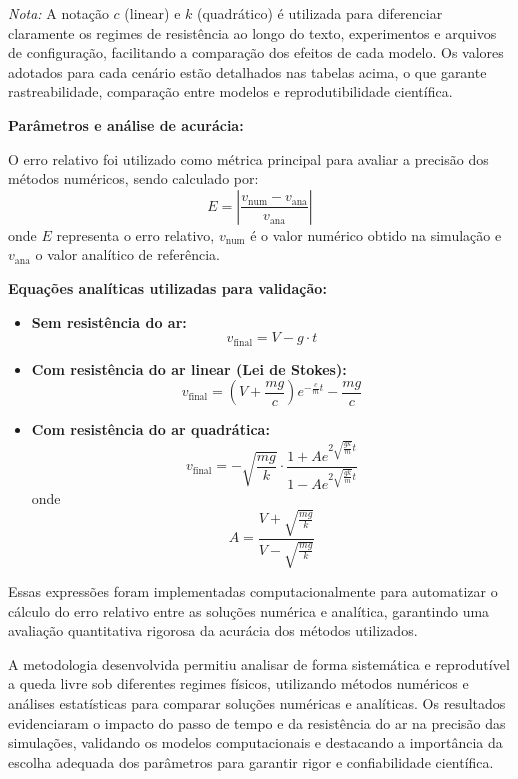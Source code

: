 \textit{Nota:} A notação $c$ (linear) e $k$ (quadrático) é utilizada para diferenciar claramente os regimes de resistência ao longo do texto, experimentos e arquivos de configuração, facilitando a comparação dos efeitos de cada modelo. Os valores adotados para cada cenário estão detalhados nas tabelas acima, o que garante rastreabilidade, comparação entre modelos e reprodutibilidade científica.

\textbf{Parâmetros e análise de acurácia:}


O erro relativo foi utilizado como métrica principal para avaliar a precisão dos métodos numéricos, sendo calculado por:
\begin{equation}
    E = \left| \frac{v_{\text{num}} - v_{\text{ana}}}{v_{\text{ana}}} \right|
\end{equation}
onde $E$ representa o erro relativo, $v_{\text{num}}$ é o valor numérico obtido na simulação e $v_{\text{ana}}$ o valor analítico de referência.

\textbf{Equações analíticas utilizadas para validação:}
\begin{itemize}
    \item \textbf{Sem resistência do ar:}
    \begin{equation}
        v_{\text{final}} = V - g \cdot t
    \end{equation}
    \item \textbf{Com resistência do ar linear (Lei de Stokes):}
    \begin{equation}
        v_{\text{final}} = \left(V + \frac{mg}{c}\right) e^{-\frac{c}{m} t} - \frac{mg}{c}
    \end{equation}
    \item \textbf{Com resistência do ar quadrática:}
    \begin{equation}
        v_{\text{final}} = -\sqrt{\frac{mg}{k}} \cdot \frac{1 + A e^{2 \sqrt{\frac{gk}{m}} t}}{1 - A e^{2 \sqrt{\frac{gk}{m}} t}}
    \end{equation}
    onde
    \begin{equation}
        A = \frac{V + \sqrt{\frac{mg}{k}}}{V - \sqrt{\frac{mg}{k}}}
    \end{equation}
\end{itemize}
Essas expressões foram implementadas computacionalmente para automatizar o cálculo do erro relativo entre as soluções numérica e analítica, garantindo uma avaliação quantitativa rigorosa da acurácia dos métodos utilizados.

A metodologia desenvolvida permitiu analisar de forma sistemática e reprodutível a queda livre sob diferentes regimes físicos, utilizando métodos numéricos e análises estatísticas para comparar soluções numéricas e analíticas. Os resultados evidenciaram o impacto do passo de tempo e da resistência do ar na precisão das simulações, validando os modelos computacionais e destacando a importância da escolha adequada dos parâmetros para garantir rigor e confiabilidade científica.